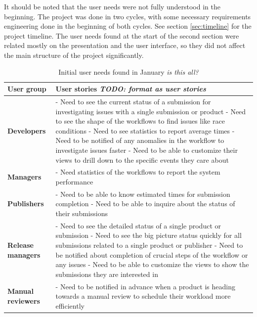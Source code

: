 \documentclass[english,12pt,a4paper,pdftex,sci,utf8]{aaltothesis}
\theoremstyle{definition}
\newcommand{\nyi}[1]{\noindent\colorbox{nyibg}{\textcolor{nyitext}{\emph{#1}}}}
\begin{document}
It should be noted that the user needs were not fully understood in the beginning. The project was done in two cycles, with some necessary requirements engineering done in the beginning of both cycles. See section \ref{sec:timeline} for the project timeline. 
The user needs found at the start of the second section were related mostly on the presentation and the user interface, so they did not affect the main structure of the project significantly.


\begin{table}[htb]
\begin{center}
\begin{tabularx}{\linewidth}{| l | X |}
\hline
\textbf{User group} & \textbf{User stories} \nyi{TODO: format as user stories} \\
\hline \hline
\textbf{Developers} & 
- Need to see the current status of a submission for investigating issues with a single submission or product \newline 
- Need to see the shape of the workflows to find issues like race conditions\newline
- Need to see statistics to report average times \newline
- Need to be notified of any anomalies in the workflow to investigate issues faster\newline
- Need to be able to customize their views to drill down to the specific events they care about\\
\hline
\textbf{Managers} & 
- Need statistics of the workflows to report the system performance \\
\hline
\textbf{Publishers} & 
- Need to be able to know estimated times for submission completion \newline
- Need to be able to inquire about the status of their submissions \\
\hline
\textbf{Release managers} &
- Need to see the detailed status of a single product or submission \newline
- Need to see the big picture status quickly for all submissions related to a single product or publisher \newline
- Need to be notified about completion of crucial steps of the workflow or any issues \newline
- Need to be able to customize the views to show the submissions they are interested in \\
\hline
\textbf{Manual reviewers} & 
- Need to be notified in advance when a product is heading towards a manual review to schedule their workload more efficiently \\
\hline
\end{tabularx}
\end{center}
\caption{Initial user needs found in January \nyi{is this all?}}
\label{tab:userneeds}
\end{table}
\end{document}
